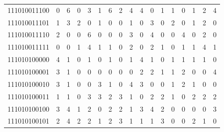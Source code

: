 \documentclass[10pt,a4paper]{article}
\begin{document}
\begin{longtable}{ |c|c|c|c|c|c|c|c|c|c|c|c|c|c|c|c|c| }
    111010011100              & 0                            & 6                                & 0                            & 3                              & 1   & 6   & 2   & 4   & 4   & 0   & 1   & 1   & 0   & 1   & 2   & 4   \\
    111010011101              & 1                            & 3                                & 2                            & 0                              & 1   & 0   & 0   & 1   & 0   & 3   & 0   & 2   & 0   & 1   & 2   & 0   \\
    111010011110              & 2                            & 0                                & 0                            & 6                              & 0   & 0   & 0   & 3   & 0   & 4   & 0   & 0   & 4   & 0   & 2   & 0   \\
    111010011111              & 0                            & 0                                & 1                            & 4                              & 1   & 1   & 0   & 2   & 0   & 2   & 1   & 0   & 1   & 1   & 4   & 1   \\
    111010100000              & 4                            & 1                                & 0                            & 1                              & 0   & 1   & 0   & 1   & 4   & 1   & 0   & 1   & 1   & 1   & 1   & 0   \\
    111010100001              & 3                            & 1                                & 0                            & 0                              & 0   & 0   & 0   & 0   & 2   & 2   & 1   & 1   & 2   & 0   & 0   & 4   \\
    111010100010              & 3                            & 1                                & 0                            & 0                              & 3   & 1   & 0   & 4   & 3   & 0   & 0   & 1   & 2   & 1   & 0   & 0   \\
    111010100011              & 1                            & 1                                & 0                            & 3                              & 3   & 2   & 3   & 1   & 0   & 2   & 2   & 1   & 0   & 2   & 2   & 2   \\
    111010100100              & 3                            & 4                                & 1                            & 2                              & 0   & 2   & 2   & 1   & 3   & 4   & 2   & 0   & 0   & 0   & 0   & 3   \\
    111010100101              & 2                            & 4                                & 2                            & 2                              & 1   & 2   & 3   & 1   & 1   & 1   & 3   & 0   & 0   & 2   & 1   & 0   \\

\end{longtable}
\end{document}
